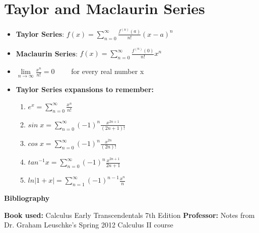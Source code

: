 \documentclass{report}
\begin{document}
	\section{Taylor and Maclaurin Series}
		\begin{itemize}\addtolength{\leftskip}{2em}
			\item \textbf{Taylor Series}: 
			\Large$f(x)=\sum\limits_{n=0}^{\infty}\frac{f^{(n)}(a)}{n!}(x-a)^n$
			\item \textbf{Maclaurin Series}:
			\Large$f(x)=\sum\limits_{n=0}^{\infty}\frac{f^{(n)}(0)}{n!}x^n$
			\item\Large $\lim\limits_{n\rightarrow \infty}\frac{x^n}{n!}=0\quad\quad$ for every real number x
			\item \textbf{Taylor Series expansions to remember:}
			\begin{enumerate}\addtolength{\leftskip}{4em}
				\item \Large $e^x=\sum\limits_{n=0}^{\infty}\frac{x^n}{n!}\quad\quad\quad\quad\quad\quad\quad\;\,$   
				\item \Large $sin\;x=\sum\limits_{n=0}^{\infty}(-1)^n\frac{x^{2n+1}}{(2n+1)!}\quad\quad$
				\item \Large $cos\;x=\sum\limits_{n=0}^{\infty}(-1)^n\frac{x^{2n}}{(2n)!}\quad\quad\;\;\;\,$   
				\item \Large $tan^{-1}x=\sum\limits_{n=0}^{\infty}(-1)^n\frac{x^{2n+1}}{2n+1}$ 
				\item \Large $ln|1+x|=\sum\limits_{n=1}^{\infty}(-1)^{n-1}\frac{x^n}{n}$
			\end{enumerate}
		\end{itemize}
		
	\begin{center}
	\newpage
	\textbf{\huge{Bibliography}}
	\end{center}
	\textbf{Book used:} Calculus Early Transcendentals 7th Edition\newline
	\textbf{Professor:} Notes from Dr. Graham Leuschke's Spring 2012 Calculus II course
\end{document}
